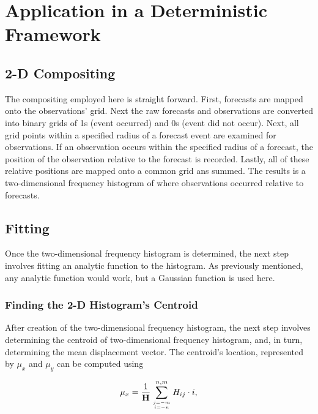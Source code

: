 \section{Application in a Deterministic Framework}
\label{dmethod}




\subsection{2-D Compositing}
\label{compositing}

The compositing employed here is straight forward. First, forecasts are mapped onto the observations' grid. Next the raw forecasts and observations are converted into binary grids of 1s (event occurred) and 0s (event did not occur). Next, all grid points within a specified radius of a forecast event are examined for observations. If an observation occurs within the specified radius of a forecast, the position of the observation relative to the forecast is recorded. Lastly, all of these relative positions are mapped onto a common grid ans summed. The results is a two-dimensional frequency histogram of where observations occurred relative to forecasts.




\subsection{Fitting}
\label{fitting}

Once the two-dimensional frequency histogram is determined, the next step involves fitting an analytic function to the histogram. As previously mentioned, any analytic function would work, but a Gaussian function is used here.




\subsubsection{Finding the 2-D Histogram's Centroid}
\label{centroid}

After creation of the two-dimensional frequency histogram, the next step involves determining the centroid of two-dimensional frequency histogram, and, in turn, determining the mean displacement vector. The centroid's location, represented by $\mu_x$ and $\mu_y$ can be computed using

    \begin{equation}
        \label{mux}
        \mu_x = \frac{1}{\mathbf{H}} \sum\limits_{j=-m \atop i=-n}^{n,m}H_{ij} \cdot i,
    \end{equation}

